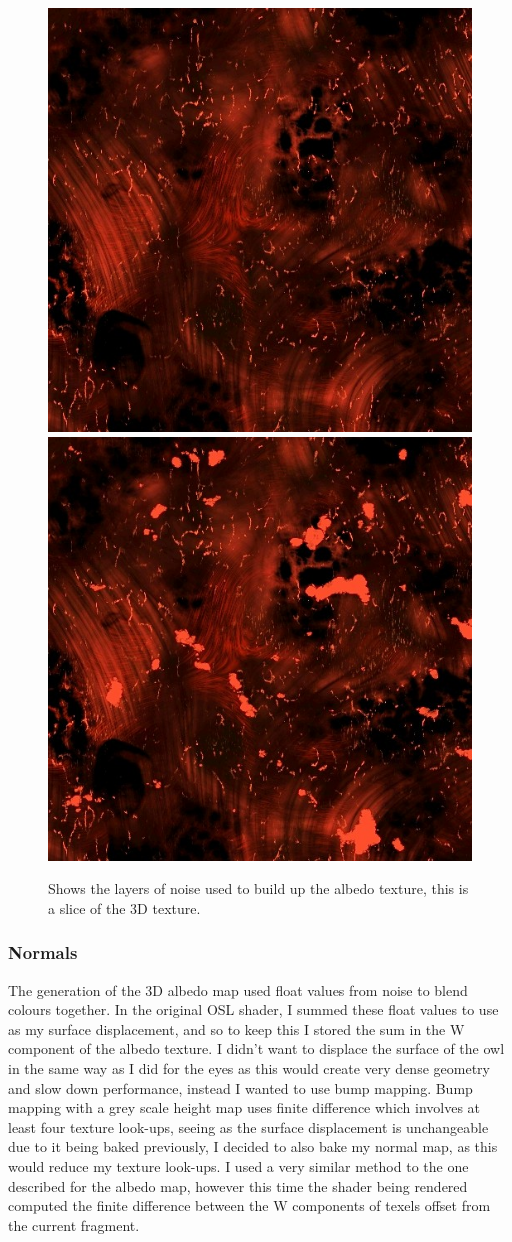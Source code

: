 \documentclass[]{acmsiggraph}
\begin{document}
\begin{figure}[htbp]
 \hfill
 {\includegraphics[width=0.24\linewidth]{images/albedo_slice_07.jpg}}
 \hfill
 {\includegraphics[width=0.24\linewidth]{images/albedo_slice_08.jpg}}
  \caption{\label{fig:albedo}Shows the layers of noise used to build up the albedo texture, this is a slice of the 3D texture.}
\end{figure}

\subsubsection{Normals}

The generation of the 3D albedo map used float values from noise to blend colours together. In the original OSL shader, I summed these float values to use as my surface displacement, and so to keep this I stored the sum in the W component of the albedo texture. I didn't want to displace the surface of the owl in the same way as I did for the eyes as this would create very dense geometry and slow down performance, instead I wanted to use bump mapping. Bump mapping with a grey scale height map uses finite difference which involves at least four texture look-ups, seeing as the surface displacement is unchangeable due to it being baked previously, I decided to also bake my normal map, as this would reduce my texture look-ups. I used a very similar method to the one described for the albedo map, however this time the shader being rendered computed the finite difference between the W components of texels offset from the current fragment. 
\end{document}
